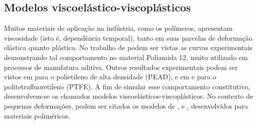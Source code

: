 \documentclass[Tese.tex]{subfiles}
\begin{document}


\subsection{Modelos viscoelástico-viscoplásticos}

Muitos materiais de aplicação na indústria, como os polímeros, apresentam viscosidade (isto é, dependência temporal), tanto em suas parcelas de deformação elástica quanto plástica. No trabalho de  podem ser vistas as curvas experimentais demonstrando tal comportamento no material Poliamida 12, muito utilizado em processos de manufatura aditiva. Outros resultados experimentais podem ser vistos em  para o polietileno de alta densidade (PEAD), e em  e  para o politetrafluoretileno (PTFE). A fim de simular esse comportamento constitutivo, desenvolvem-se os chamados modelos viscoelásticos-viscoplásticos. No contexto de pequenas deformações, podem ser citados os modelos de ,  e , desenvolvidos para materiais poliméricos.
\end{document}

